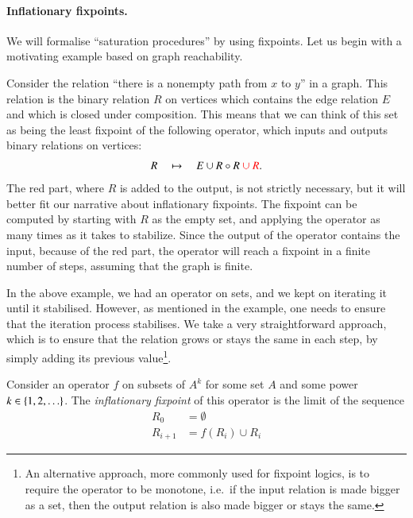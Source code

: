 \paragraph*{Inflationary fixpoints.} We will formalise ``saturation procedures'' by using fixpoints.  Let us begin with a motivating example based on graph reachability.

\begin{myexample}\label{ex:fixpoint-logic-reach}
    Consider the relation ``there is a nonempty path from $x$ to $y$'' in a graph. This relation is the binary relation $R$ on vertices  which contains the edge relation $E$ and which is closed under composition. This means that  we can think of this set as being the least fixpoint of the following operator, which inputs and outputs binary relations on vertices:
    \begin{align*}
    R  \quad \mapsto \quad   E \cup R \circ R  {\color{red}\ \cup\  R}.
    \end{align*}
    The red part, where $R$ is added to the output, is not strictly necessary, but it will better fit our narrative about inflationary fixpoints. 
     The fixpoint can be computed by starting with $R$ as the empty set, and applying the operator as many times as it takes to stabilize. Since the output of the operator contains the input, because of the red part, the operator will reach a fixpoint in a finite number of steps, assuming that the graph is finite. 
\end{myexample}

In the above example, we had an operator on sets, and we kept on iterating it until it stabilised. However, as mentioned in the example, one needs to ensure that the iteration process stabilises.
We take a very straightforward approach, which is  to ensure that the relation grows or stays the same in each step, by simply adding its previous value\footnote{An alternative approach, more commonly used for fixpoint logics, is to require the operator to be monotone, i.e.~if the input relation is made bigger as a set, then the output relation is also made bigger or stays the same. }.


\begin{definition}\label{def:inflationary-fixpoint}
    Consider an operator $f$ on subsets of $A^k$ for some set $A$ and some power $k \in \{1,2,\ldots\}$. The \emph{inflationary fixpoint} of this operator is the limit of the sequence 
    \begin{align*}
    R_0 & = \emptyset \\
    R_{i+1} & = f(R_i) \cup R_i
    \end{align*}
\end{definition}

